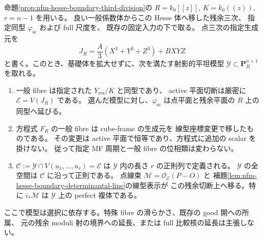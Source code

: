 \begin{proposition}[周期を変えない残余三次の積分模型]
\label{prop:nfm-hesse-boundary-integral-residual-model}
命題\ref{prop:nfm-hesse-boundary-third-division}の
$R=k_0[[z]]$, $K=k_0((z))$, $r=n-1$ を用いる。
良い一般係数体からこの Hesse 体へ移した残余三次、
指定同型 $\varphi_{\mathrm{sc}}$ および full 尺度を、
既存の固定入力の下で取る。
点三次の指定生成元を
\[
 J_R=\frac{A}{3}(X^3+Y^3+Z^3)+BXYZ
\]
と書く。このとき、基礎体を拡大せずに、次を満たす射影的平坦模型
$\mathcal Y\subset\mathbf P_R^{n+1}$ を取れる。
\begin{enumerate}
\item 一般 fibre は指定された $Y_{\mathrm{res}}/K$ と同型であり、
      active 平面切断は厳密に $\mathcal E=V(J_R)$ である。
      選んだ模型に対し、$\varphi_{\mathrm{sc}}$ は点平面と残余平面の
      $R$ 上の同型へ延びる。
\item 方程式 $F_R$ の一般 fibre は cube-frame の生成元を
      線型座標変更で移したものである。
      その変更は active 平面で恒等であり、方程式に追加の scalar を掛けない。
      従って指定 MF 周期と一般 fibre の位相類は変わらない。
\item $\mathcal C:=\mathcal Y\cap V(u_1,\ldots,u_r)=\mathcal E$ は
      $\mathcal Y$ 内の長さ $r$ の正則列で定義される。
      $\mathcal Y$ の全空間は $\mathcal C$ に沿って正則である。
      点線束 $\mathcal M=\mathcal O_{\mathcal E}(P-O)$ と
      補題\ref{lem:nfm-hesse-boundary-determinantal-line}の線型表示が
      この残余切断上へ移る。特に $i_*\mathcal M$ は
      $\mathcal Y$ 上の perfect 複体である。
\end{enumerate}
ここで模型は選択に依存する。特殊 fibre の滑らかさ、既存の good 開への所属、
元の残余 moduli 射の境界への延長、または full 比較核の延長は主張しない。
\end{proposition}

